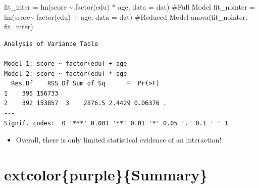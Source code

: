 \documentclass[
  letterpaper,
  DIV=11,
  numbers=noendperiod]{scrreprt}
\newenvironment{Shaded}{\begin{snugshade}}{\end{snugshade}}
\newcommand{\AttributeTok}[1]{\textcolor[rgb]{0.40,0.45,0.13}{#1}}
\newcommand{\CommentTok}[1]{\textcolor[rgb]{0.37,0.37,0.37}{#1}}
\newcommand{\FunctionTok}[1]{\textcolor[rgb]{0.28,0.35,0.67}{#1}}
\newcommand{\NormalTok}[1]{\textcolor[rgb]{0.00,0.23,0.31}{#1}}
\newcommand{\OtherTok}[1]{\textcolor[rgb]{0.00,0.23,0.31}{#1}}
\newcommand{\SpecialCharTok}[1]{\textcolor[rgb]{0.37,0.37,0.37}{#1}}
\providecommand{\tightlist}{%
  \setlength{\itemsep}{0pt}\setlength{\parskip}{0pt}}\usepackage{longtable,booktabs,array}
\begin{document}
\begin{Shaded}
\begin{Highlighting}[]
\NormalTok{fit\_inter }\OtherTok{=} \FunctionTok{lm}\NormalTok{(score }\SpecialCharTok{\textasciitilde{}} \FunctionTok{factor}\NormalTok{(edu) }\SpecialCharTok{*}\NormalTok{ age, }\AttributeTok{data =}\NormalTok{ dat) }\CommentTok{\#Full Model}
\NormalTok{fit\_nointer }\OtherTok{=} \FunctionTok{lm}\NormalTok{(score}\SpecialCharTok{\textasciitilde{}} \FunctionTok{factor}\NormalTok{(edu) }\SpecialCharTok{+}\NormalTok{ age, }\AttributeTok{data =}\NormalTok{ dat) }\CommentTok{\#Reduced Model}
\FunctionTok{anova}\NormalTok{(fit\_nointer, fit\_inter)}
\end{Highlighting}
\end{Shaded}

\begin{verbatim}
Analysis of Variance Table

Model 1: score ~ factor(edu) + age
Model 2: score ~ factor(edu) * age
  Res.Df    RSS Df Sum of Sq      F  Pr(>F)  
1    395 156733                              
2    392 153857  3    2876.5 2.4429 0.06376 .
---
Signif. codes:  0 '***' 0.001 '**' 0.01 '*' 0.05 '.' 0.1 ' ' 1
\end{verbatim}

\begin{itemize}
\tightlist
\item
  Overall, there is only limited statistical evidence of an interaction!
\end{itemize}

\hypertarget{extcolorpurplesummary}{%
\section*{extcolor\{purple\}\{Summary\}}\label{extcolorpurplesummary}}

\end{document}

